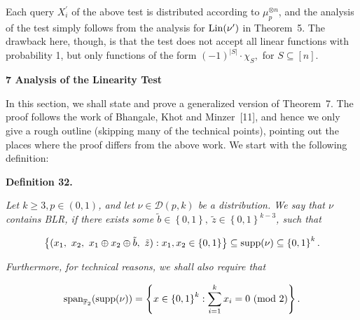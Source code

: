 Each query $X_{i}^{\prime}$ of the above test is distributed according to $\mu_{p}^{\otimes n}$, and the analysis of the test simply follows from the analysis for $\textnormal{Lin}(\nu^{\prime})$ in Theorem 5.
The drawback here, though, is that the test does not accept all linear functions with probability 1, but only functions of the form $(-1)^{\left|S\right|}\cdot\chi_{S},$ for $S\subseteq[n]$.\par







\par\medskip\noindent\textbf{
7 Analysis of the Linearity Test}\par




In this section, we shall state and prove a generalized version of Theorem 7.
The proof follows the work of Bhangale, Khot and Minzer [11], and hence we only give a rough outline (skipping many of the technical points), pointing out the places where the proof differs from the above work.
We start with the following definition:\par





\par\medskip\noindent\textbf{
\textbf{Definition 32}\textbf{.}
}\par



\emph{Let $k\geqslant 3,p\in(0,1)$, and let $\nu\in\mathcal{D}(p,k)$ be a distribution.
We say that $\nu$ contains BLR, if there exists some $\tilde{b}\in\left\{0,1\right\},\ \tilde{z}\in\left\{0,1\right\}^{k-3}$, such that}\par


\[\begin{gathered}
\left\{(x_{1},\ x_{2},\ x_{1}\oplus x_{2}\oplus\tilde{b},\ \tilde{z}):x_{1},x_{2}\in\left\{0,1\right\}\right\}\subseteq\textnormal{supp}(\nu)\subseteq\left\{0,1\right\}^{k}.
\end{gathered}\]


\emph{Furthermore, for technical reasons, we shall also require that}\par


\[\begin{gathered}
\textnormal{span}_{\mathbb{F}_{2}}(\textnormal{supp}(\nu))=\left\{x\in\left\{0,1\right\}^{k}:\sum_{i=1}^{k}x_{i}=0\textnormal{ (mod 2)}\right\}.
\end{gathered}\]



